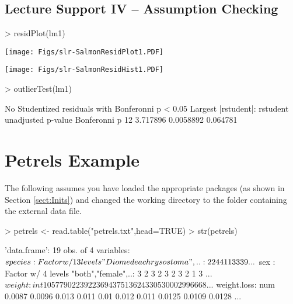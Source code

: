 \documentclass[a4paper]{article}
\begin{document}
\subsection{Lecture Support IV -- Assumption Checking}
\begin{Schunk}
\begin{Sinput}
> residPlot(lm1)
\end{Sinput}
\end{Schunk}
\texttt{[image: Figs/slr-SalmonResidPlot1.PDF]}

\begin{Schunk}
\end{Schunk}
\texttt{[image: Figs/slr-SalmonResidHist1.PDF]}

\begin{Schunk}
\begin{Sinput}
> outlierTest(lm1)
\end{Sinput}
\begin{Soutput}
No Studentized residuals with Bonferonni p < 0.05
Largest |rstudent|:
   rstudent unadjusted p-value Bonferonni p
12 3.717896          0.0058892     0.064781
\end{Soutput}
\end{Schunk}




\section{Petrels Example}
The following assumes you have loaded the appropriate packages (as shown in Section \ref{sect:Inits}) and changed the working directory to the folder containing the external data file.
\vspace{-12pt}
\begin{Schunk}
\begin{Sinput}
> petrels <- read.table("petrels.txt",head=TRUE)
> str(petrels)
\end{Sinput}
\begin{Soutput}
'data.frame':	19 obs. of  4 variables:
 $ species    : Factor w/ 13 levels "Diomedea chrysostoma",..: 2 2 4 4 1 1 3 3 3 9 ...
 $ sex        : Factor w/ 4 levels "both","female",..: 3 2 3 2 3 2 3 2 1 3 ...
 $ weight     : int  10577 9022 3922 3694 3751 3624 3305 3000 2996 668 ...
 $ weight.loss: num  0.0087 0.0096 0.013 0.011 0.01 0.012 0.011 0.0125 0.0109 0.0128 ...
\end{Soutput}
\end{Schunk}
\vspace{-12pt}
\end{document}
